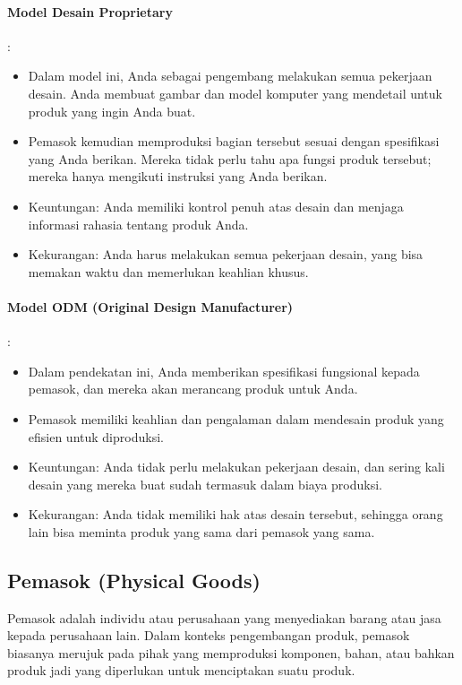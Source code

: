 \documentclass{article}
\begin{document}
\paragraph{Model Desain Proprietary}:
\begin{itemize}
    \item Dalam model ini, Anda sebagai pengembang melakukan semua pekerjaan desain. Anda membuat gambar dan model komputer yang mendetail untuk produk yang ingin Anda buat.
    \item Pemasok kemudian memproduksi bagian tersebut sesuai dengan spesifikasi yang Anda berikan. Mereka tidak perlu tahu apa fungsi produk tersebut; mereka hanya mengikuti instruksi yang Anda berikan.
    \item Keuntungan: Anda memiliki kontrol penuh atas desain dan menjaga informasi rahasia tentang produk Anda.
    \item Kekurangan: Anda harus melakukan semua pekerjaan desain, yang bisa memakan waktu dan memerlukan keahlian khusus.
\end{itemize}
\paragraph{Model ODM (Original Design Manufacturer)}:
\begin{itemize}
    \item Dalam pendekatan ini, Anda memberikan spesifikasi fungsional kepada pemasok, dan mereka akan merancang produk untuk Anda.
    \item Pemasok memiliki keahlian dan pengalaman dalam mendesain produk yang efisien untuk diproduksi.
    \item Keuntungan: Anda tidak perlu melakukan pekerjaan desain, dan sering kali desain yang mereka buat sudah termasuk dalam biaya produksi.
    \item Kekurangan: Anda tidak memiliki hak atas desain tersebut, sehingga orang lain bisa meminta produk yang sama dari pemasok yang sama.
\end{itemize}

\subsection{Pemasok (Physical Goods)}
Pemasok adalah individu atau perusahaan yang menyediakan barang atau jasa kepada perusahaan lain. Dalam konteks pengembangan produk, pemasok biasanya merujuk pada pihak yang memproduksi komponen, bahan, atau bahkan produk jadi yang diperlukan untuk menciptakan suatu produk.
\end{document}
